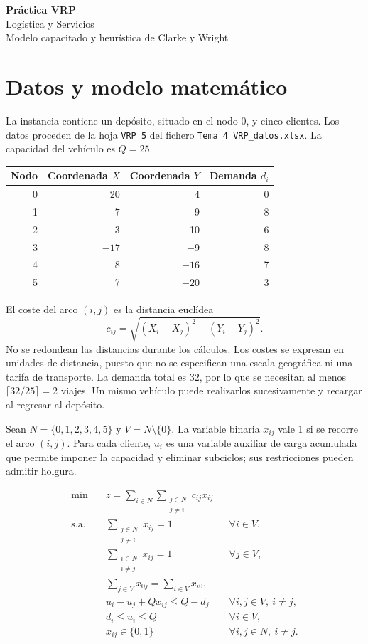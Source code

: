 \documentclass[10pt,a4paper]{article}
\begin{document}
\begin{center}
  {\Large\bfseries Práctica VRP}\\[4pt]
  Logística y Servicios\\[2pt]
  Modelo capacitado y heurística de Clarke y Wright
\end{center}

\section{Datos y modelo matemático}

La instancia contiene un depósito, situado en el nodo 0, y cinco clientes.
Los datos proceden de la hoja \texttt{VRP 5} del fichero
\texttt{Tema 4 VRP\_datos.xlsx}. La capacidad del vehículo es $Q=25$.

\begin{center}
\begin{tabular}{rrrr}
\toprule
Nodo & Coordenada $X$ & Coordenada $Y$ & Demanda $d_i$\\
\midrule
0 & 20 & 4 & 0\\
1 & $-7$ & 9 & 8\\
2 & $-3$ & 10 & 6\\
3 & $-17$ & $-9$ & 8\\
4 & 8 & $-16$ & 7\\
5 & 7 & $-20$ & 3\\
\bottomrule
\end{tabular}
\end{center}

El coste del arco $(i,j)$ es la distancia euclídea
\[
 c_{ij}=\sqrt{(X_i-X_j)^2+(Y_i-Y_j)^2}.
\]
No se redondean las distancias durante los cálculos. Los costes se expresan
en unidades de distancia, puesto que no se especifican una escala geográfica
ni una tarifa de transporte. La demanda total es $32$, por lo que se necesitan
al menos $\lceil32/25\rceil=2$ viajes. Un mismo vehículo puede realizarlos
sucesivamente y recargar al regresar al depósito.

Sean $N=\{0,1,2,3,4,5\}$ y $V=N\setminus\{0\}$. La variable binaria
$x_{ij}$ vale 1 si se recorre el arco $(i,j)$. Para cada cliente, $u_i$
es una variable auxiliar de carga acumulada que permite imponer la capacidad
y eliminar subciclos; sus restricciones pueden admitir holgura.

\begin{align}
 \min\quad & z=\sum_{i\in N}\sum_{\substack{j\in N\\j\ne i}}c_{ij}x_{ij}
 \label{eq:obj}\\
 \text{s.a.}\quad
 & \sum_{\substack{j\in N\\j\ne i}}x_{ij}=1 && \forall i\in V,\\
 & \sum_{\substack{i\in N\\i\ne j}}x_{ij}=1 && \forall j\in V,\\
 & \sum_{j\in V}x_{0j}=\sum_{i\in V}x_{i0},\\
 & u_i-u_j+Qx_{ij}\le Q-d_j && \forall i,j\in V,\ i\ne j,\label{eq:mtz}\\
 & d_i\le u_i\le Q && \forall i\in V,\\
 & x_{ij}\in\{0,1\} && \forall i,j\in N,\ i\ne j.
\end{align}
\end{document}
